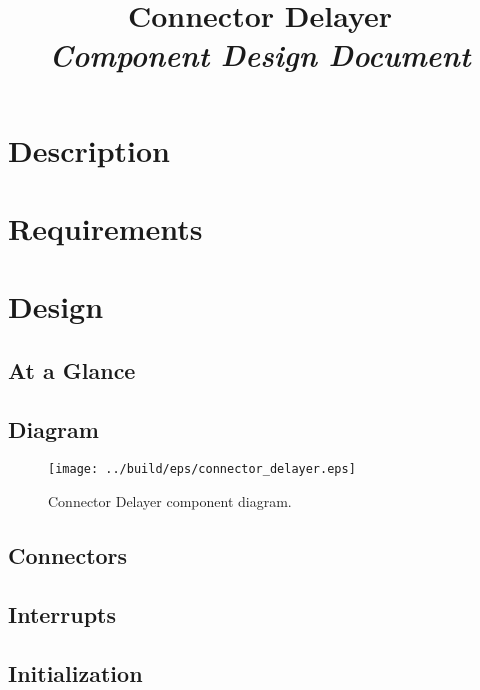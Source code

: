 



\title{\textbf{Connector Delayer} \\
\large\textit{Component Design Document}}
\date{}
\maketitle

\section{Description}


\section{Requirements}


\section{Design}

\subsection{At a Glance}


\subsection{Diagram}
\begin{figure}[H]
  \texttt{[image: ../build/eps/connector\_delayer.eps]}
  \caption{Connector Delayer component diagram.}
\end{figure}

\subsection{Connectors}


\subsection{Interrupts}



\subsection{Initialization}


